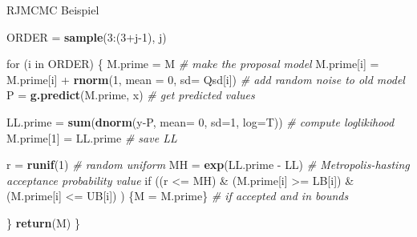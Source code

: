 \documentclass[ignorenonframetext,]{beamer}
\newenvironment{Shaded}{\begin{snugshade}}{\end{snugshade}}
\newcommand{\KeywordTok}[1]{\textcolor[rgb]{0.13,0.29,0.53}{\textbf{{#1}}}}
\newcommand{\DataTypeTok}[1]{\textcolor[rgb]{0.13,0.29,0.53}{{#1}}}
\newcommand{\DecValTok}[1]{\textcolor[rgb]{0.00,0.00,0.81}{{#1}}}
\newcommand{\StringTok}[1]{\textcolor[rgb]{0.31,0.60,0.02}{{#1}}}
\newcommand{\CommentTok}[1]{\textcolor[rgb]{0.56,0.35,0.01}{\textit{{#1}}}}
\newcommand{\NormalTok}[1]{{#1}}
\begin{document}
\begin{frame}{RJMCMC Beispiel}
\begin{Shaded}
\begin{Highlighting}[]
\NormalTok{ORDER =}\StringTok{ }\KeywordTok{sample}\NormalTok{(}\DecValTok{3}\NormalTok{:(}\DecValTok{3}\NormalTok{+j}\DecValTok{-1}\NormalTok{), j)}

\NormalTok{for (i in ORDER)}
\NormalTok{\{}
\NormalTok{M.prime =}\StringTok{ }\NormalTok{M                                           }\CommentTok{# make the proposal model}
\NormalTok{M.prime[i] =}\StringTok{ }\NormalTok{M.prime[i] +}\StringTok{ }\KeywordTok{rnorm}\NormalTok{(}\DecValTok{1}\NormalTok{, }\DataTypeTok{mean =} \DecValTok{0}\NormalTok{, }\DataTypeTok{sd=} \NormalTok{Qsd[i]) }\CommentTok{# add random noise to old model}
\NormalTok{P =}\StringTok{ }\KeywordTok{g.predict}\NormalTok{(M.prime, x)                             }\CommentTok{# get predicted values}

\NormalTok{LL.prime =}\StringTok{ }\KeywordTok{sum}\NormalTok{(}\KeywordTok{dnorm}\NormalTok{(y-P, }\DataTypeTok{mean=} \DecValTok{0}\NormalTok{, }\DataTypeTok{sd=}\DecValTok{1}\NormalTok{, }\DataTypeTok{log=}\NormalTok{T))      }\CommentTok{# compute loglikihood}
\NormalTok{M.prime[}\DecValTok{1}\NormalTok{] =}\StringTok{ }\NormalTok{LL.prime                                 }\CommentTok{# save LL}

\NormalTok{r =}\StringTok{ }\KeywordTok{runif}\NormalTok{(}\DecValTok{1}\NormalTok{)                                          }\CommentTok{# random uniform}
\NormalTok{MH =}\StringTok{ }\KeywordTok{exp}\NormalTok{(LL.prime -}\StringTok{ }\NormalTok{LL)                               }\CommentTok{# Metropolis-hasting acceptance probability value}
\NormalTok{if ((r <=}\StringTok{ }\NormalTok{MH) &}\StringTok{ }\NormalTok{(M.prime[i] >=}\StringTok{ }\NormalTok{LB[i]) &}\StringTok{ }\NormalTok{(M.prime[i] <=}\StringTok{ }\NormalTok{UB[i])  ) \{M =}\StringTok{ }\NormalTok{M.prime\}                            }\CommentTok{# if accepted and in bounds}

\NormalTok{\}}
\KeywordTok{return}\NormalTok{(M)}
\NormalTok{\}}
\end{Highlighting}
\end{Shaded}


\end{frame}
\end{document}
